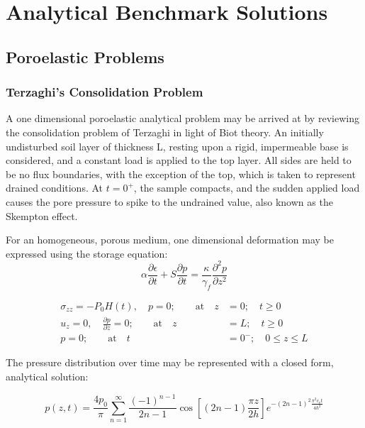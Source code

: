
\chapter{\label{cha:Analytical-Solns}Analytical Benchmark Solutions}


\section{\label{sec:PoroelasticProblems}Poroelastic Problems}

\subsection{\label{sub:Terzaghi-Consolidation}Terzaghi's Consolidation Problem}

A one dimensional poroelastic analytical problem may be arrived at
by reviewing the consolidation problem of Terzaghi\cite{Terzaghi:1923} in light
of Biot theory. An initially undisturbed soil layer of thickness L, resting upon
a rigid, impermeable base is considered, and a constant load is applied to the top
layer. All sides are held to be no flux boundaries, with the exception of the top,
which is taken to represent drained conditions. At $t = 0^{+}$, the sample compacts,
and the sudden applied load causes the pore pressure to spike to the undrained 
value, also known as the Skempton effect.\par

\smallskip

For an homogeneous, porous medium, one dimensional deformation may be expressed
using the storage equation\cite{Verruijt:2013}:
\begin{equation}
 \alpha \frac{\partial \epsilon}{\partial t} + S \frac{\partial p}{\partial t} = \frac{\kappa}{\gamma_{f}} \frac{\partial^{2} p}{\partial z^{2}}
\end{equation}


\begin{align}
 \sigma_{zz} = -P_{0}H(t), \quad p = 0; \qquad \text{at} \quad z &=0; \quad t \geq 0 \\
 u_{z} = 0, \quad \frac{\partial p}{\partial z} = 0; \qquad \text{at} \quad z &= L; \quad t \geq 0 \\
 p=0; \qquad \text{at} \quad t &= 0^{-}; \quad 0 \leq z \leq L
\end{align}

The pressure distribution over time may be represented with a closed form, analytical
solution:

\begin{equation}
 p(z,t) = \frac{4 p_{0}} {\pi} \sum_{n = 1}^{\infty} \frac{(-1)^{n-1}}{2n-1} \cos \left[ \left(2 n -1 \right) \frac{\pi z}{2 h} \right] e^{-\left(2 n - 1 \right)^{2} \frac{ \pi^{2} c_{v} t}{4 h^{2}}}
\end{equation}



